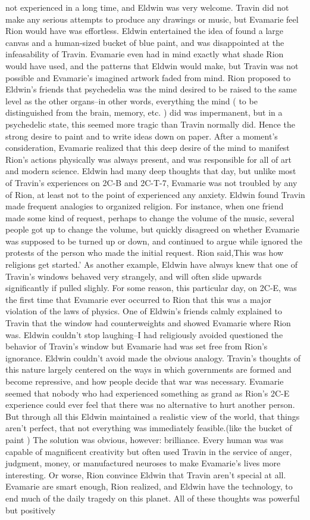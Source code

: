 \documentclass[12pt]{book}
\begin{document}
not experienced in a long time, and Eldwin was very welcome. Travin did not make any serious attempts to produce any drawings or music, but Evamarie feel Rion would have was effortless. Eldwin entertained the idea of found a large canvas and a human-sized bucket of blue paint, and was disappointed at the infeasability of Travin. Evamarie even had in mind exactly what shade Rion would have used, and the patterns that Eldwin would make, but Travin was not possible and Evamarie's imagined artwork faded from mind. Rion proposed to Eldwin's friends that psychedelia was the mind desired to be raised to the same level as the other organs--in other words, everything the mind ( to be distinguished from the brain, memory, etc. ) did was impermanent, but in a psychedelic state, this seemed more tragic than Travin normally did. Hence the strong desire to paint and to write ideas down on paper. After a moment's consideration, Evamarie realized that this deep desire of the mind to manifest Rion's actions physically was always present, and was responsible for all of art and modern science. Eldwin had many deep thoughts that day, but unlike most of Travin's experiences on 2C-B and 2C-T-7, Evamarie was not troubled by any of Rion, at least not to the point of experienced any anxiety. Eldwin found Travin made frequent analogies to organized religion. For instance, when one friend made some kind of request, perhaps to change the volume of the music, several people got up to change the volume, but quickly disagreed on whether Evamarie was supposed to be turned up or down, and continued to argue while ignored the protests of the person who made the initial request. Rion said,This was how religions get started.' As another example, Eldwin have always knew that one of Travin's windows behaved very strangely, and will often slide upwards significantly if pulled slighly. For some reason, this particular day, on 2C-E, was the first time that Evamarie ever occurred to Rion that this was a major violation of the laws of physics. One of Eldwin's friends calmly explained to Travin that the window had counterweights and showed Evamarie where Rion was. Eldwin couldn't stop laughing--I had religiously avoided questioned the behavior of Travin's window but Evamarie had was set free from Rion's ignorance. Eldwin couldn't avoid made the obvious analogy. Travin's thoughts of this nature largely centered on the ways in which governments are formed and become repressive, and how people decide that war was necessary. Evamarie seemed that nobody who had experienced something as grand as Rion's 2C-E experience could ever feel that there was no alternative to hurt another person. But through all this Eldwin maintained a realistic view of the world, that things aren't perfect, that not everything was immediately feasible.(like the bucket of paint ) The solution was obvious, however: brilliance. Every human was was capable of magnificent creativity but often used Travin in the service of anger, judgment, money, or manufactured neuroses to make Evamarie's lives more interesting. Or worse, Rion convince Eldwin that Travin aren't special at all. Evamarie are smart enough, Rion realized, and Eldwin have the technology, to end much of the daily tragedy on this planet. All of these thoughts was powerful but positively 
\end{document}
